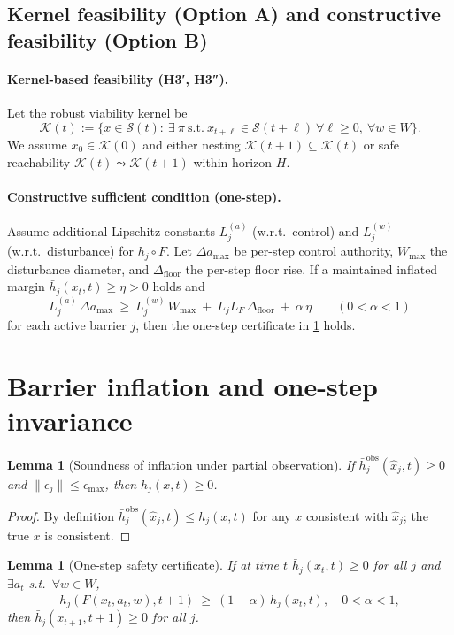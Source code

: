\documentclass[11pt]{article}
\newtheorem{lemma}[theorem]{Lemma}
\theoremstyle{definition}
\newcommand{\K}{\mathcal{K}}
\newcommand{\Sset}{\mathcal{S}}
\newcommand{\1}{\mathbf{1}}
\begin{document}
\subsection{Kernel feasibility (Option A) and constructive feasibility (Option B)}
\paragraph{Kernel-based feasibility (H3′, H3″).}
Let the robust viability kernel be
\[
\K(t):=\{x\in \Sset(t):\ \exists\ \pi\ \text{s.t.}\ x_{t+\ell}\in \Sset(t+\ell)\ \forall \ell\ge 0,\ \forall w\in W\}.
\]
We assume $x_0\in \K(0)$ and either nesting $\K(t+1)\subseteq \K(t)$ or safe reachability $\K(t)\leadsto \K(t+1)$ within horizon $H$.

\paragraph{Constructive sufficient condition (one-step).}
Assume additional Lipschitz constants $L^{(a)}_j$ (w.r.t.\ control) and $L^{(w)}_j$ (w.r.t.\ disturbance) for $h_j\circ F$. Let $\Delta a_{\max}$ be per-step control authority, $W_{\max}$ the disturbance diameter, and $\Delta_{\mathrm{floor}}$ the per-step floor rise. If a maintained inflated margin $\bar h_j(x_t,t)\ge \eta>0$ holds and
\begin{equation}
\label{eq:star}
L^{(a)}_j\,\Delta a_{\max}\ \ge\ L^{(w)}_j\,W_{\max}\ +\ L_j L_F\,\Delta_{\mathrm{floor}}\ +\ \alpha\,\eta\qquad(0<\alpha<1)
\end{equation}
for each active barrier $j$, then the one-step certificate in \cref{lem:oneStep} holds.

\section{Barrier inflation and one-step invariance}

\begin{lemma}[Soundness of inflation under partial observation]
\label{lem:sound}
If $\bar h^{\mathrm{obs}}_j(\hat x_j,t)\ge 0$ and $\|\epsilon_j\|\le \epsilon_{\max}$, then $h_j(x,t)\ge 0$.
\end{lemma}
\begin{proof}
By definition $\bar h^{\mathrm{obs}}_j(\hat x_j,t)\le h_j(x,t)$ for any $x$ consistent with $\hat x_j$; the true $x$ is consistent.
\end{proof}

\begin{lemma}[One-step safety certificate]
\label{lem:oneStep}
If at time $t$ $\bar h_j(x_t,t)\ge 0$ for all $j$ and $\exists a_t$ s.t.\ $\forall w\in W$,
\[
\bar h_j(F(x_t,a_t,w),t{+}1)\ \ge\ (1-\alpha)\,\bar h_j(x_t,t),\quad 0<\alpha<1,
\]
then $\bar h_j(x_{t+1},t{+}1)\ge 0$ for all $j$.
\end{lemma}
\end{document}

